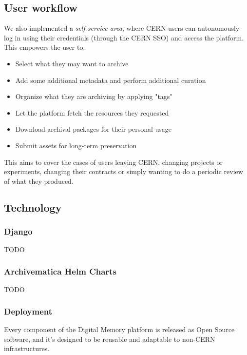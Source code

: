 \documentclass[11pt]{IEEEtran}
\begin{document}
\subsection{User workflow}

We also implemented a \textit{self-service area}, where CERN users can autonomously log in using their credentials (through the CERN SSO) and access the platform. This empowers the user to:

\begin{itemize}
    \item Select what they may want to archive 
    \item Add some additional metadata and perform additional curation
    \item Organize what they are archiving by applying "tags"
    \item Let the platform fetch the resources they requested 
    \item Download archival packages for their personal usage
    \item Submit assets for long-term preservation
\end{itemize}

This aims to cover the cases of users leaving CERN, changing projects or experiments, changing their contracts or simply wanting to do a periodic review of what they produced.

\subsection{Technology}

\subsubsection{Django}

TODO

\subsubsection{Archivematica Helm Charts}

TODO

\subsubsection{Deployment}

Every component of the Digital Memory platform is released as Open Source software, and it's designed to be reusable and adaptable to non-CERN infrastructures.
\end{document}
